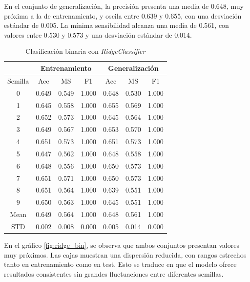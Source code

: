 \vspace{1em}

En el conjunto de generalización, la precisión presenta una media de 0.648, muy próxima a la de entrenamiento, y oscila entre 0.639 y 0.655, con una desviación estándar de 0.005. La mínima sensibilidad alcanza una media de 0.561, con valores entre 0.530 y 0.573 y una desviación estándar de 0.014.

\begin{table}[H]
	\centering
	\begin{tabular}{ |c|c|c|c|c|c|c| }
		\hline
		\rowcolor{LightCyan}
		 & \multicolumn{3}{c|}{Entrenamiento} & \multicolumn{3}{c|}{Generalización} \\
		\hline
		\rowcolor{LightCyan}
		 Semilla & Acc & MS & F1 & Acc & MS & F1 \\
		\hline
		0 & 0.649 & 0.549 & 1.000 & 0.648 & 0.530 & 1.000 \\
		1 & 0.645 & 0.558 & 1.000 & 0.655 & 0.569 & 1.000 \\
		2 & 0.652 & 0.573 & 1.000 & 0.645 & 0.564 & 1.000 \\
		3 & 0.649 & 0.567 & 1.000 & 0.653 & 0.570 & 1.000 \\
		4 & 0.651 & 0.573 & 1.000 & 0.651 & 0.573 & 1.000 \\
		5 & 0.647 & 0.562 & 1.000 & 0.648 & 0.558 & 1.000 \\
		6 & 0.648 & 0.556 & 1.000 & 0.650 & 0.573 & 1.000 \\
		7 & 0.651 & 0.571 & 1.000 & 0.650 & 0.573 & 1.000 \\
		8 & 0.651 & 0.564 & 1.000 & 0.639 & 0.551 & 1.000 \\
		9 & 0.650 & 0.563 & 1.000 & 0.645 & 0.551 & 1.000 \\
		Mean & 0.649 & 0.564 & 1.000 & 0.648 & 0.561 & 1.000 \\
		STD & 0.002 & 0.008 & 0.000 & 0.005 & 0.014 & 0.000 \\
		\hline
	\end{tabular}
	\caption{Clasificación binaria con \textit{RidgeClassifier}}
	\label{tabla:ridge_bin}
\end{table}

En el gráfico \ref{fig:ridge_bin}, se observa que ambos conjuntos presentan valores muy próximos. Las cajas muestran una dispersión reducida, con rangos estrechos tanto en entrenamiento como en test. Esto se traduce en que el modelo ofrece resultados consistentes sin grandes fluctuaciones entre diferentes semillas.

